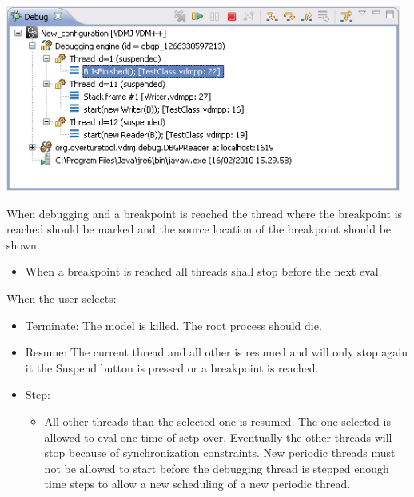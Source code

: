 \documentclass{overturerep}
\begin{document}
\includegraphics[width=369pt]{figures/stackTrace.png}


When debugging and a breakpoint is reached the thread where the breakpoint is reached should be marked and the source location of the breakpoint should be shown.

\begin{itemize}
	\item When a breakpoint is reached all threads shall stop before the next eval.
\end{itemize}



When the user selects:

\begin{itemize}
	\item Terminate: The model is killed. The root process should die.
	\item Resume: The current thread and all other is resumed and will only stop again it the Suspend button is pressed or a breakpoint is reached.
	\item Step:
\begin{itemize}
	\item All other threads than the selected one is resumed. The one selected is allowed to eval one time of setp over. Eventually the other threads will stop because of synchronization constraints. New periodic threads must not be allowed to start before the debugging thread is stepped enough time steps to allow a new scheduling of a new periodic thread.
\end{itemize}

\end{itemize}




\end{document}
